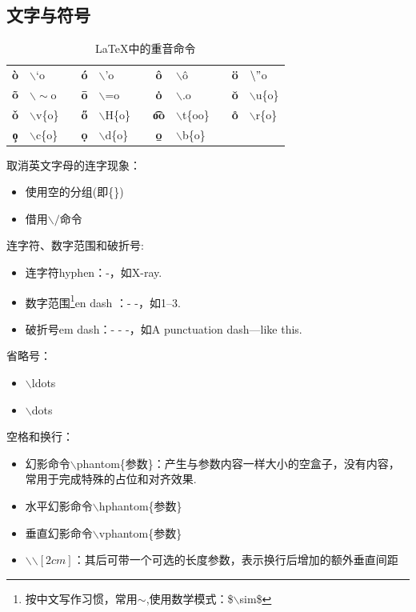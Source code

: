 \subsection{文字与符号}
\begin{table}[h]
\begin{center}
\caption{LaTeX中的重音命令}
\begin{tabular}{clcclcclccl}
\bottomrule
\textbf{\`o}&$\backslash $`o&\qquad \qquad \qquad &\textbf{\'o}&$\backslash$'o&\qquad \qquad \qquad &\textbf{\^o}&$\backslash$\^o&\qquad \qquad \qquad &\textbf{\"o}&$\backslash "$o  \\
\textbf{\~o}&$\backslash \sim$o&\qquad &\textbf{\=o}&$\backslash$=o&\qquad &\textbf{\.o}&$\backslash$.o&\qquad &\textbf{\u{o}}&$\backslash$u\{o\}\\
\textbf{\v{o}}&$\backslash$v\{o\}&\qquad &\textbf{\H{o}}&$\backslash$H\{o\}&\qquad &\textbf{\t{oo}}&$\backslash$t\{oo\}&\qquad &\textbf{\r{o}}&$\backslash$r\{o\}\\
\textbf{\c{o}}&$\backslash$c\{o\}&\qquad &\textbf{\d{o}}&$\backslash$d\{o\}&\qquad &\textbf{\b{o}}&$\backslash$b\{o\}&\qquad & & \\
\toprule
\end{tabular}
\end{center}
\end{table}
\noindent 
取消英文字母的连字现象：
\begin{itemize}
\item 使用空的分组(即\{\})
\item 借用$\backslash /$命令
\end{itemize}
\noindent 
连字符、数字范围和破折号:
\begin{itemize}
\item 连字符hyphen：-，如X-ray.
\item 数字范围\footnote{按中文写作习惯，常用$\sim $,使用数学模式：\$$\backslash$sim\$}en dash ：- -，如1--3.
\item 破折号em dash：- - -，如A punctuation dash---like this.
\end{itemize}
\noindent 
省略号：
\begin{itemize}
\item $\backslash$ldots
\item $\backslash$dots
\end{itemize}
空格和换行：
\begin{itemize}
\item 幻影命令$\backslash$phantom\{参数\}：产生与参数内容一样大小的空盒子，没有内容，常用于完成特殊的占位和对齐效果.
\item 水平幻影命令$\backslash$hphantom\{参数\}
\item 垂直幻影命令$\backslash$vphantom\{参数\}
\item $\backslash$$\backslash[2cm]$：其后可带一个可选的长度参数，表示换行后增加的额外垂直间距
\end{itemize}
